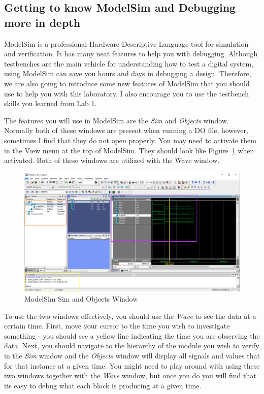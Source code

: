 \documentclass{article}
\begin{document}
\subsection{Getting to know ModelSim and Debugging more in depth}

ModelSim is a professional Hardware Descriptive Language tool for
simulation and verification.  It has many neat features to help you
with debugging.  Although testbenches are the main vehicle for
understanding how to test a digital system, using ModelSim can save
you hours and days in debugging a design.  Therefore, we are also
going to introduce some new features of ModelSim that you should use
to help you with this laboratory. I also encourage you to use the
testbench skills you learned from Lab 1.

The features you will use in ModelSim are the \textit{Sim} and
\textit{Objects} window.  Normally both of these windows are present
when running a DO file, however, sometimes I find that they do not
open properly.  You may need to activate them in the View menu at the
top of ModelSim.  They should look like Figure~\ref{modelsim.png} when
activated.  Both of these windows are utilized with the Wave window.
\begin{figure} [t!]
  \centering
  \includegraphics[scale=0.3]{modelsim.png}
  \caption{ModelSim Sim and Objects Window}
  \label{modelsim.png}
\end{figure}

To use the two windows effectively, you should use the \textit{Wave}
to see the data at a certain time.  First, move your cursor to the
time you wish to investigate something - you should see a yellow line
indicating the time you are observing the data.  Next, you
should navigate to the
hierarchy of the module you wish to verify in the \textit{Sim} window
and the \textit{Objects} window will display all signals and values
that for that instance at a given time.  You might need to play around
with using these two windows together with the \textit{Wave} window,
but once you do you will find that its easy to debug what each block
is producing at a given time.
\end{document}
